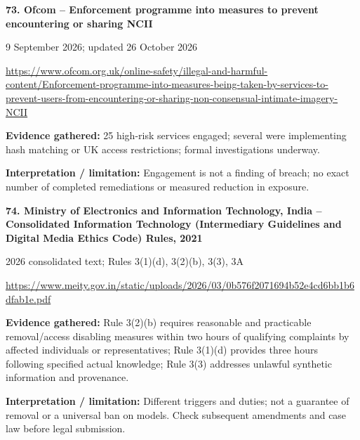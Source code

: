 \documentclass[11pt,a4paper]{article}
\begin{document}
\noindent\begin{minipage}{\linewidth}\textbf{73. Ofcom -- Enforcement programme into measures to prevent encountering or sharing NCII}\par{\small 9 September 2026; updated 26 October 2026\par\url{https://www.ofcom.org.uk/online-safety/illegal-and-harmful-content/Enforcement-programme-into-measures-being-taken-by-services-to-prevent-users-from-encountering-or-sharing-non-consensual-intimate-imagery-NCII}}\par
\textbf{Evidence gathered:} 25 high-risk services engaged; several were implementing hash matching or UK access restrictions; formal investigations underway.\par\textbf{Interpretation / limitation:} Engagement is not a finding of breach; no exact number of completed remediations or measured reduction in exposure.\par\end{minipage}\par\vspace{2mm}
\noindent\begin{minipage}{\linewidth}\textbf{74. Ministry of Electronics and Information Technology, India -- Consolidated Information Technology (Intermediary Guidelines and Digital Media Ethics Code) Rules, 2021}\par{\small 2026 consolidated text; Rules 3(1)(d), 3(2)(b), 3(3), 3A\par\url{https://www.meity.gov.in/static/uploads/2026/03/0b576f2071694b52e4cd6bb1b6dfab1e.pdf}}\par
\textbf{Evidence gathered:} Rule 3(2)(b) requires reasonable and practicable removal/access disabling measures within two hours of qualifying complaints by affected individuals or representatives; Rule 3(1)(d) provides three hours following specified actual knowledge; Rule 3(3) addresses unlawful synthetic information and provenance.\par\textbf{Interpretation / limitation:} Different triggers and duties; not a guarantee of removal or a universal ban on models. Check subsequent amendments and case law before legal submission.\par\end{minipage}\par\vspace{2mm}
\end{document}
